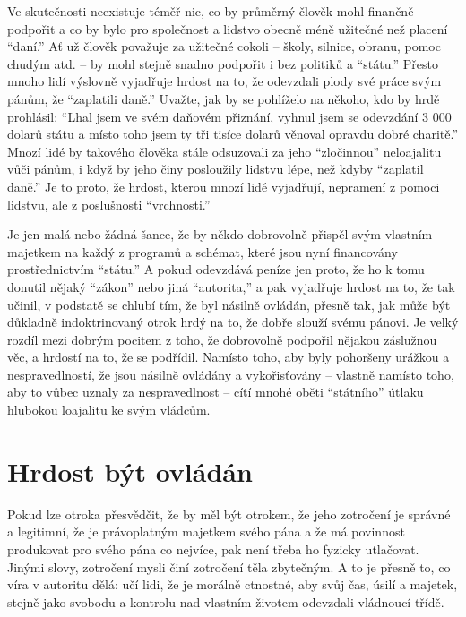\documentclass{book}
\begin{document}
Ve skutečnosti neexistuje téměř nic, co by průměrný člověk mohl finančně podpořit a co by bylo pro společnost a lidstvo obecně méně užitečné než placení \enquote{daní.} Ať už člověk považuje za užitečné cokoli -- školy, silnice, obranu, pomoc chudým atd. -- by mohl stejně snadno podpořit i bez politiků a \enquote{státu.} Přesto mnoho lidí výslovně vyjadřuje hrdost na to, že odevzdali plody své práce svým pánům, že \enquote{zaplatili daně.} Uvažte, jak by se pohlíželo na někoho, kdo by hrdě prohlásil: \enquote{Lhal jsem ve svém daňovém přiznání, vyhnul jsem se odevzdání 3 000 dolarů státu a místo toho jsem ty tři tisíce dolarů věnoval opravdu dobré charitě.} Mnozí lidé by takového člověka stále odsuzovali za jeho \enquote{zločinnou} neloajalitu vůči pánům, i když by jeho činy posloužily lidstvu lépe, než kdyby \enquote{zaplatil daně.} Je to proto, že hrdost, kterou mnozí lidé vyjadřují, nepramení z pomoci lidstvu, ale z poslušnosti \enquote{vrchnosti.}

Je jen malá nebo žádná šance, že by někdo dobrovolně přispěl svým vlastním majetkem na každý z programů a schémat, které jsou nyní financovány prostřednictvím \enquote{státu.} A pokud odevzdává peníze jen proto, že ho k tomu donutil nějaký \enquote{zákon} nebo jiná \enquote{autorita,} a pak vyjadřuje hrdost na to, že tak učinil, v podstatě se chlubí tím, že byl násilně ovládán, přesně tak, jak může být důkladně indoktrinovaný otrok hrdý na to, že dobře slouží svému pánovi. Je velký rozdíl mezi dobrým pocitem z toho, že dobrovolně podpořil nějakou záslužnou věc, a hrdostí na to, že se podřídil. Namísto toho, aby byly pohoršeny urážkou a nespravedlností, že jsou násilně ovládány a vykořisťovány -- vlastně namísto toho, aby to vůbec uznaly za nespravedlnost -- cítí mnohé oběti \enquote{státního} útlaku hlubokou loajalitu ke svým vládcům.

\section{Hrdost být ovládán}

Pokud lze otroka přesvědčit, že by měl být otrokem, že jeho zotročení je správné a legitimní, že je právoplatným majetkem svého pána a že má povinnost produkovat pro svého pána co nejvíce, pak není třeba ho fyzicky utlačovat. Jinými slovy, zotročení mysli činí zotročení těla zbytečným. A to je přesně to, co víra v autoritu dělá: učí lidi, že je morálně ctnostné, aby svůj čas, úsilí a majetek, stejně jako svobodu a kontrolu nad vlastním životem odevzdali vládnoucí třídě.
\end{document}
